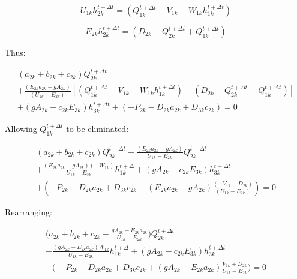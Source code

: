 \documentclass[11pt]{article}
\begin{document}
\begin{equation}
U_{1k} h_{2k}^{t + \Delta t} = (Q_{1k}^{t + \Delta t} - V_{1k} - W_{1k}
h_{1k}^{t + \Delta t})
\end{equation}

\begin{equation}
E_{2k} h_{2k}^{t + \Delta t} = (D_{2k} -
Q_{2k}^{t + \Delta t} + Q_{1k}^{t + \Delta t})
\end{equation}

Thus:

\begin{equation}
  \begin{split}
    (a_{2k} + b_{2k} + c_{2k})  Q_{2k}^{t + \Delta t} \\ + \frac{(E_{2k} a_{2k} - g A_{2k})}{(U_{1k} - E_{2k})} [(Q_{1k}^{t + \Delta t} - V_{1k} - W_{1k} h_{1k}^{t + \Delta t}) - (D_{2k} - Q_{2k}^{t + \Delta t} + Q_{1k}^{t + \Delta t})] \\ + (g A_{2k} - c_{2k} E_{3k}) h_{3k}^{t + \Delta t}   
    + (- P_{2k} - D_{2k} a_{2k}   + D_{3k} c_{2k} ) = 0 
  \end{split}
\end{equation}

Allowing $Q_{1k}^{t + \Delta t}$ to be eliminated:

\begin{equation}
  \begin{split}
    (a_{2k} + b_{2k} + c_{2k})  Q_{2k}^{t + \Delta t} + \frac{(E_{2k} a_{2k} - g A_{2k})}{U_{1k} - E_{2k}} Q_{2k}^{t + \Delta t} \\ + \frac{(E_{2k} a_{2k} - g A_{2k}) ( - W_{1k} )}{U_{1k} - E_{2k}} h_{1k}^{t + \Delta} + (g A_{2k} - c_{2k} E_{3k}) h_{3k}^{t + \Delta t}   
   \\ + (- P_{2k} - D_{2k} a_{2k}   + D_{3k} c_{2k} + (E_{2k} a_{2k} - g A_{2k}) \frac{ ( - V_{1k} - D_{2k} )}{( U_{1k} - E_{2k} )} ) = 0 
  \end{split}
\end{equation}

Rearranging:

\begin{equation}
  \begin{split}
    \biggl( a_{2k} + b_{2k} + c_{2k} - \frac{g A_{2k} - E_{2k} a_{2k}}{U_{1k} - E_{2k}} \biggr)  Q_{2k}^{t + \Delta t} \\ + \frac{(g A_{2k} - E_{2k} a_{2k}) W_{1k} }{U_{1k} - E_{2k}} h_{1k}^{t + \Delta} + (g A_{2k} - c_{2k} E_{3k}) h_{3k}^{t + \Delta t}   
   \\ + \biggl(- P_{2k} - D_{2k} a_{2k}   + D_{3k} c_{2k} + (g A_{2k} - E_{2k} a_{2k}) \frac{ V_{1k} + D_{2k} }{ U_{1k} - E_{2k} } \biggr) = 0 
  \end{split}
\end{equation}
\end{document}

